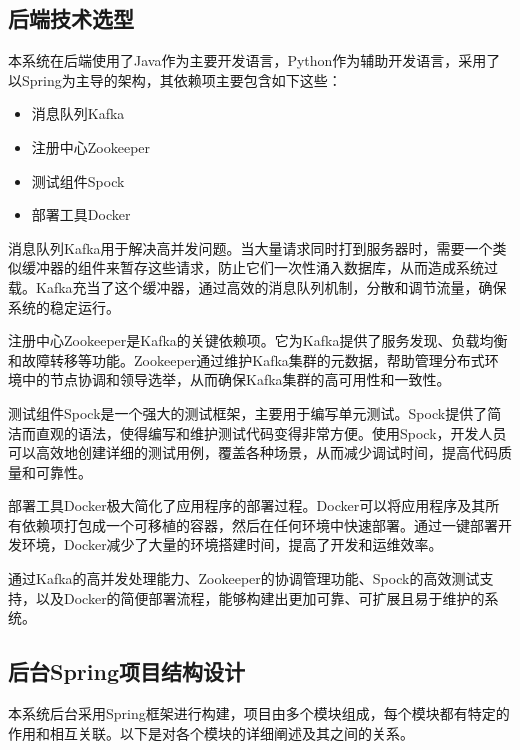 \documentclass[oneside]{xduugthesis}
\begin{document}
\subsection{后端技术选型}

本系统在后端使用了Java作为主要开发语言，Python作为辅助开发语言，采用了以Spring为主导的架构，其依赖项主要包含如下这些：

\begin{itemize}[nosep]
    \item 消息队列Kafka
    \item 注册中心Zookeeper
    \item 测试组件Spock
    \item 部署工具Docker
\end{itemize}

消息队列Kafka用于解决高并发问题。当大量请求同时打到服务器时，需要一个类似缓冲器的组件来暂存这些请求，防止它们一次性涌入数据库，从而造成系统过载。Kafka充当了这个缓冲器，通过高效的消息队列机制，分散和调节流量，确保系统的稳定运行。

注册中心Zookeeper是Kafka的关键依赖项。它为Kafka提供了服务发现、负载均衡和故障转移等功能。Zookeeper通过维护Kafka集群的元数据，帮助管理分布式环境中的节点协调和领导选举，从而确保Kafka集群的高可用性和一致性。

测试组件Spock是一个强大的测试框架，主要用于编写单元测试。Spock提供了简洁而直观的语法，使得编写和维护测试代码变得非常方便。使用Spock，开发人员可以高效地创建详细的测试用例，覆盖各种场景，从而减少调试时间，提高代码质量和可靠性。

部署工具Docker极大简化了应用程序的部署过程。Docker可以将应用程序及其所有依赖项打包成一个可移植的容器，然后在任何环境中快速部署。通过一键部署开发环境，Docker减少了大量的环境搭建时间，提高了开发和运维效率。

通过Kafka的高并发处理能力、Zookeeper的协调管理功能、Spock的高效测试支持，以及Docker的简便部署流程，能够构建出更加可靠、可扩展且易于维护的系统。

\subsection{后台Spring项目结构设计}

本系统后台采用Spring框架进行构建，项目由多个模块组成，每个模块都有特定的作用和相互关联。以下是对各个模块的详细阐述及其之间的关系。
\end{document}
